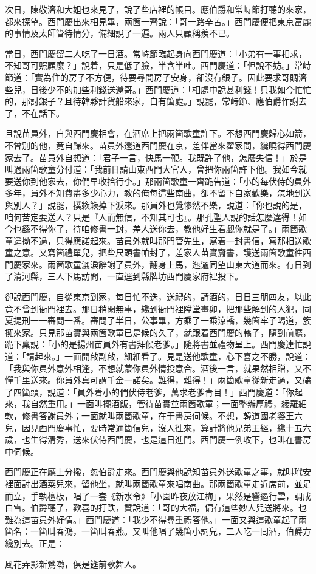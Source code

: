 次日，陳敬濟和大姐也來見了，說了些店裡的帳目。應伯爵和常峙節打聽的來家，都來探望。西門慶出來相見畢，兩箇一齊說：「哥一路辛苦。」西門慶便把東京富麗的事情及太師管待情分，備細說了一遍。兩人只顧稱羨不已。

當日，西門慶留二人吃了一日酒。常峙節臨起身向西門慶道：「小弟有一事相求，不知哥可照顧麼？」說着，只是低了臉，半含半吐。{}西門慶道：「但說不妨。」常峙節道：「實為住的房子不方便，待要尋間房子安身，卻沒有銀子。因此要求哥賙濟些兒，日後少不的加些利錢送還哥。」西門慶道：「相處中說甚利錢！只我如今忙忙的，那討銀子？且待韓夥計貨船來家，自有箇處。」說罷，常峙節、應伯爵作謝去了，不在話下。

且說苗員外，自與西門慶相會，在酒席上把兩箇歌童許下。不想西門慶歸心如箭，不曾別的他，竟自歸來。苗員外還道西門慶在京，差伴當來翟家問，纔曉得西門慶家去了。苗員外自想道：「君子一言，快馬一鞭。我既許了他，怎麼失信！」於是叫過兩箇歌童分付道：「我前日請山東西門大官人，曾把你兩箇許下他。我如今就要送你到他家去，你們早收拾行李。」那兩箇歌童一齊跪告道：「小的每伏侍的員外多年，員外不知費盡多少心力，教的俺每這些南曲，卻不留下自家歡樂，怎地到送與別人？」說罷，撲簌簌掉下淚來。那員外也覺慘然不樂，說道：「你也說的是，咱何苦定要送人？只是『人而無信，不知其可也』。那孔聖人說的話怎麼違得！如今也繇不得你了，待咱修書一封，差人送你去，{}教他好生看覷你就是了。」兩箇歌童違拗不過，只得應諾起來。苗員外就叫那門管先生，寫着一封書信，寫那相送歌童之意。又寫箇禮單兒，把些尺頭書帕封了，差家人苗實齎書，護送兩箇歌童徃西門慶家來。兩箇歌童灑淚辭謝了員外，翻身上馬，迤邐同望山東大道而來。有日到了清河縣，三人下馬訪問，一直逕到縣牌坊西門慶家府裡投下。

卻說西門慶，自從東京到家，每日忙不迭，送禮的，請酒的，日日三朋四友，以此竟不曾到衙門裡去。那日稍閑無事，纔到衙門裡陞堂畫卯，把那些解到的人犯，同夏提刑一一審問一番。審問了半日，公事畢，方乘了一乘涼轎，幾箇牢子喝道，簇擁來家。只見那苗實與兩箇歌童已是候的久了，就跟着西門慶的轎子，隨到前廳，跪下稟說：「小的是揚州苗員外有書拜候老爹。」隨將書並禮物呈上。西門慶連忙說道：「請起來。」一面開啟副啟，細細看了。見是送他歌童，心下喜之不勝，說道：「我與你員外意外相逢，不想就蒙你員外情投意合。酒後一言，就果然相贈，又不憚千里送來。你員外真可謂千金一諾矣。難得，難得！」兩箇歌童從新走過，又磕了四箇頭，說道：「員外着小的們伏侍老爹，萬求老爹青目！」西門慶道：「你起來，我自然重用。」一面叫擺酒飯，管待苗實並兩箇歌童；一面整辦厚禮，綾羅細軟，修書答謝員外；一面就叫兩箇歌童，在于書房伺候。不想，韓道國老婆王六兒，因見西門慶事忙，要時常通箇信兒，沒人徃來，算計將他兄弟王經，纔十五六歲，也生得清秀，送來伏侍西門慶，也是這日進門。西門慶一例收下，也叫在書房中伺候。

西門慶正在廳上分撥，忽伯爵走來。西門慶與他說知苗員外送歌童之事，就叫玳安裡面討出酒菜兒來，留他坐，就叫兩箇歌童來唱南曲。那兩箇歌童走近席前，並足而立，手執檀板，唱了一套《新水令》「小園昨夜放江梅」，果然是響遏行雲，調成白雪。伯爵聽了，歡喜的打跌，贊說道：「哥的大福，偏有這些妙人兒送將來。也難為這苗員外好情。」西門慶道：「我少不得尋重禮答他。」一面又與這歌童起了兩箇名：一箇叫春鴻，一箇叫春燕。又叫他唱了幾箇小詞兒，二人吃一囘酒，伯爵方纔別去。正是：

\begin{myquote}
風花弄影新鶯囀，俱是筵前歌舞人。
\end{myquote}

